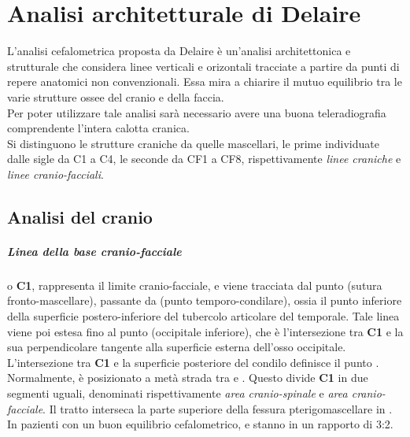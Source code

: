 \chapter{Analisi architetturale di Delaire}
\nocite{Delaire1981,Cudia1991}

L'analisi cefalometrica proposta da Delaire è un'analisi architettonica e strutturale che considera linee verticali e orizontali tracciate a partire da punti di repere anatomici non convenzionali. Essa mira a chiarire il mutuo equilibrio tra le varie strutture ossee del cranio e della faccia.\\
Per poter utilizzare tale analisi sarà necessario avere una buona teleradiografia comprendente l'intera calotta cranica.\\

Si distinguono le strutture craniche da quelle mascellari, le prime individuate dalle sigle da C1 a C4, le seconde da CF1 a CF8, rispettivamente \emph{linee craniche} e \emph{linee cranio-facciali}.\\

\section{Analisi del cranio}
\paragraph{Linea della base cranio-facciale} o \textbf{C1}, rappresenta il limite cranio-facciale, e viene tracciata dal punto  (sutura fronto-mascellare), passante da  (punto temporo-condilare), ossia il punto inferiore della superficie postero-inferiore del tubercolo articolare del temporale. Tale linea viene poi estesa fino al punto  (occipitale inferiore), che è l'intersezione tra \textbf{C1} e la sua perpendicolare tangente alla superficie esterna dell'osso occipitale.\\
L'intersezione tra \textbf{C1} e la superficie posteriore del condilo definisce il punto . Normalmente,  è posizionato a metà strada tra  e . Questo divide \textbf{C1} in due segmenti uguali, denominati rispettivamente \emph{area cranio-spinale} e \emph{area cranio-facciale}. Il tratto  interseca la parte superiore della fessura pterigomascellare in . In pazienti con un buon equilibrio cefalometrico,  e  stanno in un rapporto di 3:2.

